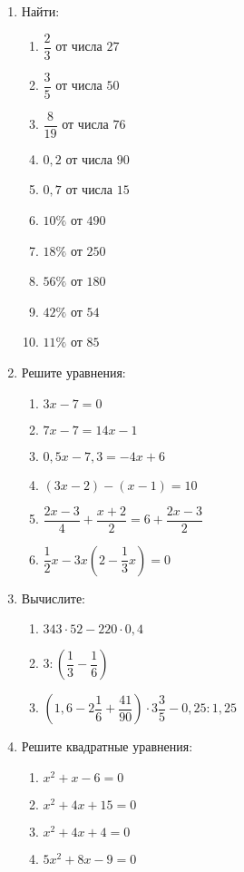 \documentclass[12pt, a4paper]{article}
\begin{document}
   \cfoot{}
\begin{enumerate}
	\item Найти:
	\begin{multicols}{2}
		\begin{enumerate}[label=\asbuk*)]
			\item $\dfrac{2}{3}$ от числа $27$
			\item $\dfrac{3}{5}$ от числа $50$
			\item $\dfrac{8}{19}$ от числа $76$
			\item $0,2$ от числа $90$
			\item $0,7$ от числа $15$
			\item $10\%$ от $490$
			\item $18\%$ от $250$
			\item $56\%$ от $180$
			\item $42\%$ от $54$
			\item $11\%$ от $85$
		\end{enumerate}
	\end{multicols}
	\item Решите уравнения:
	\begin{multicols}{2}
		\begin{enumerate}[label=\asbuk*)]
			\item $3x-7=0$
			\item $7x-7=14x-1$
			\item $0,5x-7,3=-4x+6$
			\item $(3x-2)-(x-1)=10$
			\item $\dfrac{2x-3}{4}+\dfrac{x+2}{2}=6+\dfrac{2x-3}{2}$
			\item $\dfrac{1}{2}x-3x\left(2-\dfrac{1}{3}x\right)=0 $
		\end{enumerate}
	\end{multicols}
	\item Вычислите:
	\begin{multicols}{2}
		\begin{enumerate}[label=\asbuk*)]
			\item $343\cdot 52 - 220 \cdot 0,4$
			\item $3:\left(\dfrac{1}{3}-\dfrac{1}{6}\right)$
			\item $\left(1,6-2\dfrac{1}{6}+\dfrac{41}{90}\right)\cdot3\dfrac{3}{5}-0,25:1,25$
		\end{enumerate}
	\end{multicols}
	\item Решите квадратные уравнения:
	\begin{multicols}{2}
		\begin{enumerate}[label=\asbuk*)]
			\item $x^2+x-6=0$
			\item $x^2+4x+15=0$
			\item $x^2+4x+4=0$
			\item $5x^2+8x-9=0$
		\end{enumerate}
	\end{multicols}
\end{enumerate}
\end{document}
